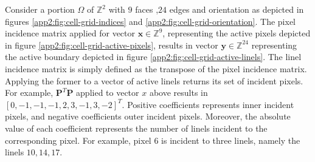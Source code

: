\begin{example}
	Consider a portion $\Omega$ of $\mathbb{Z}^2$ with $9$ faces ,$24$ edges and orientation as depicted in figures \ref{app2:fig:cell-grid-indices} and \ref{app2:fig:cell-grid-orientation}. 	
	The pixel incidence matrix applied for vector $\mathbf{x} \in \mathbb{Z}^9$, representing the active pixels depicted in figure \ref{app2:fig:cell-grid-active-pixels}, results in vector $\mathbf{y} \in \mathbb{Z}^{24}$ representing the active boundary depicted in figure \ref{app2:fig:cell-grid-active-linels}.
	The linel incidence matrix is simply defined as the transpose of the pixel incidence matrix. Applying the former to a vector of active linels returns its set of incident pixels. For example, $\mathbf{P}^{T}\mathbf{P}$ applied to vector $x$ above results in $[0,-1,-1,-1,2,3,-1,3,-2]^T$. Positive coefficients represents inner incident pixels, and negative coefficients outer incident pixels. Moreover, the absolute value of each coefficient represents the number of linels incident to the corresponding pixel. For example, pixel $6$ is incident to three linels, namely the linels $10,14,17$.

\end{example}

